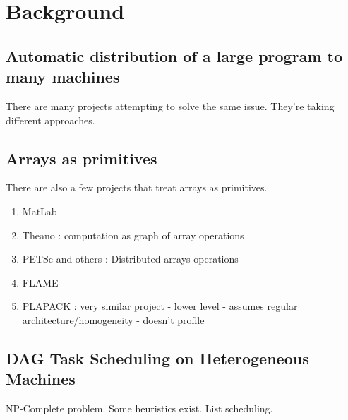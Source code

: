 \section{Background}

\subsection{Automatic distribution of a large program to many machines}
There are many projects attempting to solve the same issue. They're taking
different approaches. 

\subsection{Arrays as primitives}
There are also a few projects that treat arrays as primitives. 
\begin{enumerate}
\item MatLab
\item Theano : computation as graph of array operations
\item PETSc and others : Distributed arrays operations
\item FLAME
\item PLAPACK : very similar project - lower level - assumes regular
architecture/homogeneity - doesn't profile
\end{enumerate}

\subsection{DAG Task Scheduling on Heterogeneous Machines}
NP-Complete problem. Some heuristics exist. List scheduling. 

